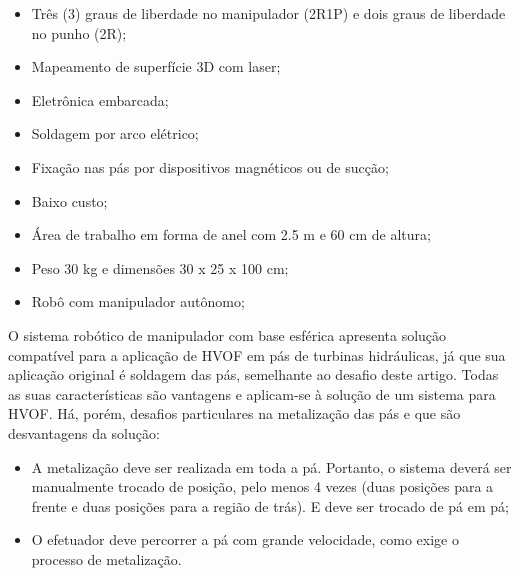 \begin{itemize}
  \item Três (3) graus de liberdade no manipulador (2R1P) e dois graus de
  liberdade no punho (2R);
  \item Mapeamento de superfície 3D com laser;
  \item Eletrônica embarcada;
  \item Soldagem por arco elétrico;
  \item Fixação nas pás por dispositivos magnéticos ou de sucção;
  \item Baixo custo;
  \item Área de trabalho em forma de anel com 2.5 m e 60 cm de altura;
  \item Peso 30 kg e dimensões 30 x 25 x 100 cm;
  \item Robô com manipulador autônomo;
\end{itemize}

O sistema robótico de manipulador com base esférica apresenta solução compatível
para a aplicação de HVOF em pás de turbinas hidráulicas, já que sua aplicação
original é soldagem das pás, semelhante ao desafio deste artigo. Todas as suas
características são vantagens e aplicam-se à solução de um sistema para HVOF.
Há, porém, desafios particulares na metalização das pás e que são desvantagens
da solução:

\begin{itemize}
  \item A metalização deve ser realizada em toda a pá. Portanto, o sistema
  deverá ser manualmente trocado de posição, pelo menos 4 vezes (duas posições
  para a frente e duas posições para a região de trás). E deve ser trocado de pá
  em pá;
  \item O efetuador deve percorrer a pá com grande velocidade, como exige o
  processo de metalização.
\end{itemize}
